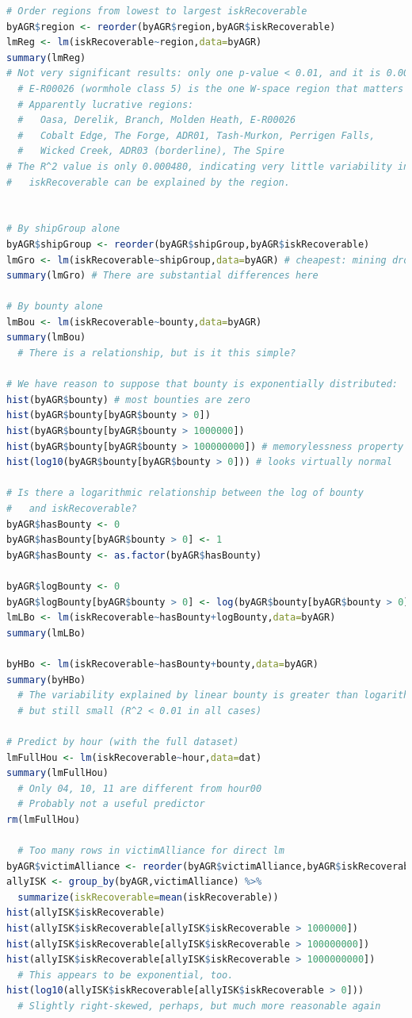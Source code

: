\documentclass[letterpaper,12pt,article]{memoir}
\begin{document}
{\begin{lstlisting}[language=R]
  # Order regions from lowest to largest iskRecoverable
byAGR$region <- reorder(byAGR$region,byAGR$iskRecoverable)
lmReg <- lm(iskRecoverable~region,data=byAGR)
summary(lmReg)
# Not very significant results: only one p-value < 0.01, and it is 0.0077
  # E-R00026 (wormhole class 5) is the one W-space region that matters
  # Apparently lucrative regions: 
  #   Oasa, Derelik, Branch, Molden Heath, E-R00026
  #   Cobalt Edge, The Forge, ADR01, Tash-Murkon, Perrigen Falls,
  #   Wicked Creek, ADR03 (borderline), The Spire
# The R^2 value is only 0.000480, indicating very little variability in
#   iskRecoverable can be explained by the region.


# By shipGroup alone
byAGR$shipGroup <- reorder(byAGR$shipGroup,byAGR$iskRecoverable)
lmGro <- lm(iskRecoverable~shipGroup,data=byAGR) # cheapest: mining drone
summary(lmGro) # There are substantial differences here

# By bounty alone
lmBou <- lm(iskRecoverable~bounty,data=byAGR)
summary(lmBou)
  # There is a relationship, but is it this simple?

# We have reason to suppose that bounty is exponentially distributed:
hist(byAGR$bounty) # most bounties are zero
hist(byAGR$bounty[byAGR$bounty > 0])
hist(byAGR$bounty[byAGR$bounty > 1000000])
hist(byAGR$bounty[byAGR$bounty > 100000000]) # memorylessness property
hist(log10(byAGR$bounty[byAGR$bounty > 0])) # looks virtually normal

# Is there a logarithmic relationship between the log of bounty
#   and iskRecoverable?
byAGR$hasBounty <- 0
byAGR$hasBounty[byAGR$bounty > 0] <- 1
byAGR$hasBounty <- as.factor(byAGR$hasBounty)

byAGR$logBounty <- 0
byAGR$logBounty[byAGR$bounty > 0] <- log(byAGR$bounty[byAGR$bounty > 0])
lmLBo <- lm(iskRecoverable~hasBounty+logBounty,data=byAGR)
summary(lmLBo)

byHBo <- lm(iskRecoverable~hasBounty+bounty,data=byAGR)
summary(byHBo)
  # The variability explained by linear bounty is greater than logarithmic
  # but still small (R^2 < 0.01 in all cases)

# Predict by hour (with the full dataset)
lmFullHou <- lm(iskRecoverable~hour,data=dat)
summary(lmFullHou)
  # Only 04, 10, 11 are different from hour00
  # Probably not a useful predictor
rm(lmFullHou)

  # Too many rows in victimAlliance for direct lm
byAGR$victimAlliance <- reorder(byAGR$victimAlliance,byAGR$iskRecoverable)
allyISK <- group_by(byAGR,victimAlliance) %>% 
  summarize(iskRecoverable=mean(iskRecoverable))
hist(allyISK$iskRecoverable)
hist(allyISK$iskRecoverable[allyISK$iskRecoverable > 1000000])
hist(allyISK$iskRecoverable[allyISK$iskRecoverable > 100000000])
hist(allyISK$iskRecoverable[allyISK$iskRecoverable > 1000000000])
  # This appears to be exponential, too.
hist(log10(allyISK$iskRecoverable[allyISK$iskRecoverable > 0]))
  # Slightly right-skewed, perhaps, but much more reasonable again


\end{lstlisting}}
\end{document}
